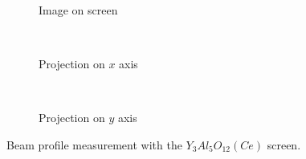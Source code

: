 \begin{figure}[!ht]
	\begin{subfigure}{0.3\textwidth}
		
		\caption{Image on screen}
		\label{}
	\end{subfigure}
	~
	\begin{subfigure}{0.3\textwidth}
		
		\caption{Projection on $x$ axis}
		\label{}
  \end{subfigure}
  ~
  \begin{subfigure}{0.3\textwidth}
		
		\caption{Projection on $y$ axis}
		\label{}
  \end{subfigure}
	\caption[Beam profile measurement with the $Y_{3}Al_{5}O_{12}(Ce)$ screen]{Beam profile measurement with the $Y_{3}Al_{5}O_{12}(Ce)$ screen.}
	\label{chap4:ScreenBeam}
\end{figure}